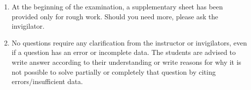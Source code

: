 \documentclass[addpoints,answers,a4paper,11pt]{exam}
\begin{document}
{\begin{enumerate}
         number of additional page in the original space.
      \item At the beginning of the examination, a supplementary sheet has been
         provided only for rough work. Should you need more, please ask the
         invigilator.
      \item No questions require any clarification from the instructor or
         invigilators, even if a question has an error or incomplete data. The
         students are advised to write answer according to their understanding
         or write reasons for why it is not possible to solve partially or
         completely that question by citing errors/insufficient data. 
   \end{enumerate}


   \vspace{0.2in}
   \begin{center}
      \cellwidth{12mm} 
      \gradetable[h][questions]
   \end{center}

   \newpage

}
\end{document}
